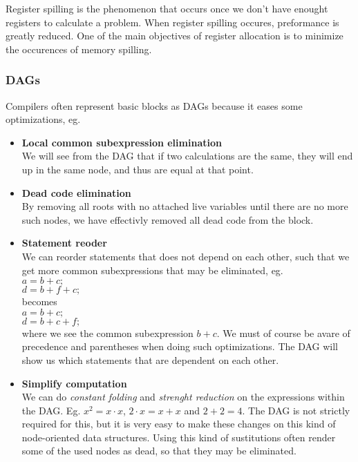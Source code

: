 \documentclass[english,a4paper]{scrartcl}
\begin{document}
Register spilling is the phenomenon that occurs once we don't have enought
registers to calculate a problem. When register spilling occures, preformance
is greatly reduced. One of the main objectives of register allocation is to
minimize the occurences of memory spilling. 

\subsubsection{DAGs}
Compilers often represent basic blocks as DAGs because it eases some
optimizations, eg.
\begin{itemize}
  \item \textbf{Local common subexpression elimination}\\
  We will see from the DAG that if two calculations are the same, they will end
  up in the same node, and thus are equal at that point. 
  \item  \textbf{Dead code elimination}\\
  By removing all roots with no attached live variables until there are no more
  such nodes, we have effectivly removed all dead code from the block.
  \item  \textbf{Statement reoder}\\
  We can reorder statements that does not depend on each other, such that we get
  more common subexpressions that may be eliminated, eg. \\
  $a = b + c;$\\$d = b + f
  + c;$\\becomes\\ $a = b + c;$\\$d = b + c + f;$\\ where we see the common
  subexpression $b + c$. We must of course be avare of precedence and
  parentheses when doing such optimizations. The DAG will show us which
  statements that are dependent on each other.
  \item  \textbf{Simplify computation}\\
  We can do \emph{constant folding} and \emph{strenght reduction} on the
  expressions within the DAG. Eg. $x^2 = x \cdot x$, $2 \cdot x = x + x$ and
  $2 + 2 = 4$.
  The DAG is not strictly required for this, but it is very easy to make these
  changes on this kind of node-oriented data structures. Using this kind of
  sustitutions often render some of the used nodes as dead, so that they may be
  eliminated.
\end{itemize}
\end{document}
